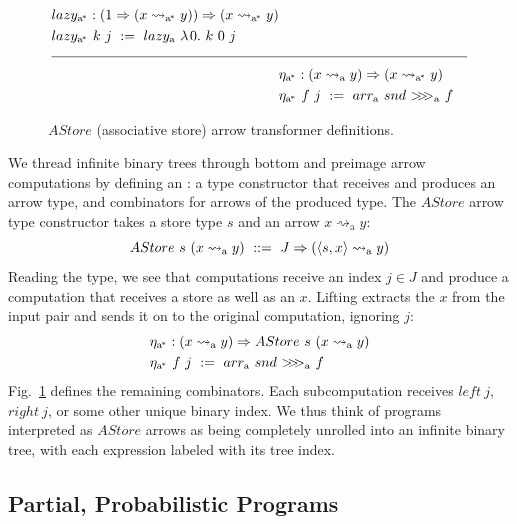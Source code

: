 \documentclass{llncs}
\newcommand{\figref}[1]{Fig.~\ref{#1}}
\newcommand{\arrow}{\rightsquigarrow}
\newcommand{\arrowarr}{\ensuremath{arr}}
\newcommand{\arrowcomp}{\ensuremath{{>}\mspace{-6mu}{>}\mspace{-6mu}{>}}}
\newcommand{\arrowlazy}{\ensuremath{lazy}}
\newcommand{\arrowtrans}{\ensuremath{\eta}}
\newcommand{\gen}{_\mathrm{a}}
\newcommand{\genc}{_\mathrm{a^{\mspace{-2mu}*}}}
\begin{document}
\begin{figure}[!tb]
\begin{align*}
\begin{aligned}[t]
\begin{aligned}[t]
		&\arrowlazy\genc : (1 \tto (x \arrow\genc y)) \tto (x \arrow\genc y) \\
		&\arrowlazy\genc~k~j \ := \ \arrowlazy\gen~\fun{0}{k~0~j}
	\end{aligned} \\
\\[-8pt]
\hline
\\[-8pt]
	&\begin{aligned}[t]
		&\arrowtrans\genc : (x \arrow\gen y) \tto (x \arrow\genc y) \\
		&\arrowtrans\genc~f~j \ := \ \arrowarr\gen~snd~\arrowcomp\gen~f
	\end{aligned}
\end{aligned}
\end{align*}
\bottomhrule
\caption[ ]{$AStore$ (associative store) arrow transformer definitions.}
\label{fig:astore-arrow-defs}
\end{figure}

We thread infinite binary trees through bottom and preimage arrow computations by defining an : a type constructor that receives and produces an arrow type, and combinators for arrows of the produced type.
The $AStore$ arrow type constructor takes a store type $s$ and an arrow $x \arrow\gen y$:
\begin{equation}
	AStore~s~(x \arrow\gen y) \ ::= \ J \tto (\pair{s,x} \arrow\gen y)
\end{equation}
Reading the type, we see that computations receive an index $j \in J$ and produce a computation that receives a store as well as an $x$.
Lifting extracts the $x$ from the input pair and sends it on to the original computation, ignoring $j$:
\begin{equation}
\begin{aligned}
	&\arrowtrans\genc : (x \arrow\gen y) \tto AStore~s~(x \arrow\gen y) \\
	&\arrowtrans\genc~f~j \ := \ \arrowarr\gen~snd~\arrowcomp\gen~f
\end{aligned}
\end{equation}
\figref{fig:astore-arrow-defs} defines the remaining combinators.
Each subcomputation receives $left~j$, $right~j$, or some other unique binary index.
We thus think of programs interpreted as $AStore$ arrows as being completely unrolled into an infinite binary tree, with each expression labeled with its tree index.


\subsection{Partial, Probabilistic Programs}
\label{sec:probabilistic-programs}
\end{document}
